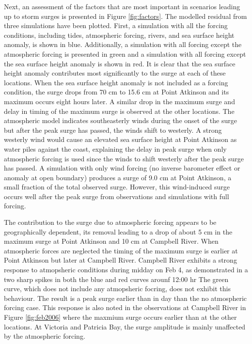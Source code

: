 \documentclass[pdftex,10pt]{article}
\begin{document}
Next, an assessment of the factors that are most important in scenarios leading up to storm surges is presented in Figure \ref{fig:factors}. The modelled residual from three simulations have been plotted. First, a simulation with all the forcing conditions, including tides, atmospheric forcing, rivers, and sea surface height anomaly, is shown in blue. Additionally, a simulation with all forcing except the atmospheric forcing is presented in green and a simulation with all forcing except the sea surface height anomaly is shown in red. It is clear that the sea surface height anomaly contributes most significantly to the surge at each of these locations. When the sea surface height anomaly is not included as a forcing condition, the surge drops from 70 cm to 15.6 cm at Point Atkinson and its maximum occurs eight hours later.  A similar drop in the maximum surge and delay in timing of the maximum surge is observed at the other locations. The atmospheric model indicates southeasterly winds during the onset of the surge but after the peak surge has passed, the winds shift to westerly. A strong westerly wind would cause an elevated sea surface height at Point Atkinson as water piles against the coast, explaining the delay in peak surge when only atmospheric forcing is used since the winds to shift westerly after the peak surge has passed. A simulation with only wind forcing (no inverse barometer effect or anomaly at open boundary) produces a surge of 9.0 cm at Point Atkinson, a small fraction of the total observed surge. However, this wind-induced surge occurs well after the peak surge from observations and simulations with full forcing.

The contribution to the surge due to atmospheric forcing appears to be geographically dependent, its removal leading to a drop of about 5 cm in the maximum surge at Point Atkinson and 10 cm at Campbell River. When atmospheric forces are neglected the timing of the maximum surge is earlier at Point Atkinson but later at Campbell River. Campbell River exhibits a strong response to atmopsheric conditions during midday on Feb 4, as demonstrated in a two sharp spikes in both the blue and red curves arounf 12:00 hr The green curve, which does not include any atmopsheric focring, does not exhibit this behaviour. The result is a peak surge earlier than in day than the no atmospheric forcing case. This response is also noted in the observations at Campbell River in Figure \ref{fig:feb2006} where the maxmium surge occurs earlier than at the other locations. At Victoria and Patricia Bay, the surge amplitude is mainly unaffected by the atmospheric forcing. 
\end{document}
